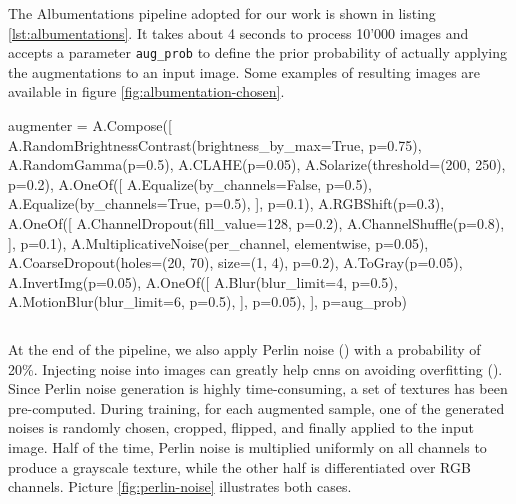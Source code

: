 \medskip

The Albumentations pipeline adopted for our work is shown in listing \ref{lst:albumentations}. It takes about 4 seconds to process 10'000 images and accepts a parameter \texttt{aug\_prob} to define the prior probability of actually applying the augmentations to an input image. Some examples of resulting images are available in figure \ref{fig:albumentation-chosen}.

\vspace{0.1cm}
\begin{python}
augmenter = A.Compose([
	A.RandomBrightnessContrast(brightness_by_max=True, p=0.75),
	A.RandomGamma(p=0.5),
	A.CLAHE(p=0.05),
	A.Solarize(threshold=(200, 250), p=0.2),
	A.OneOf([
		A.Equalize(by_channels=False, p=0.5),
		A.Equalize(by_channels=True, p=0.5),
	], p=0.1),
	A.RGBShift(p=0.3),
	A.OneOf([
		A.ChannelDropout(fill_value=128, p=0.2),
		A.ChannelShuffle(p=0.8),
	], p=0.1),
	A.MultiplicativeNoise(per_channel, elementwise, p=0.05),
	A.CoarseDropout(holes=(20, 70), size=(1, 4), p=0.2),
	A.ToGray(p=0.05),
	A.InvertImg(p=0.05),
	A.OneOf([
		A.Blur(blur_limit=4, p=0.5),
		A.MotionBlur(blur_limit=6, p=0.5),
	], p=0.05),
], p=aug_prob)
\end{python}
\vspace{-0.5cm}
\begin{lstlisting}[frame=none,caption={Chosen Albumentations pipeline}, 
label=lst:albumentations]
\end{lstlisting}

At the end of the pipeline, we also apply Perlin noise (\cite{perlin-noise}) with a probability of 20\%. Injecting noise into images can greatly help \gls{cnn}s on avoiding overfitting (\cite{shorten2019augmentationsurvey}). Since Perlin noise generation is highly time-consuming, a set of textures has been pre-computed. During training, for each augmented sample, one of the generated noises is randomly chosen, cropped, flipped, and finally applied to the input image. Half of the time, Perlin noise is multiplied uniformly on all channels to produce a grayscale texture, while the other half is differentiated over RGB channels. Picture \ref{fig:perlin-noise} illustrates both cases.

